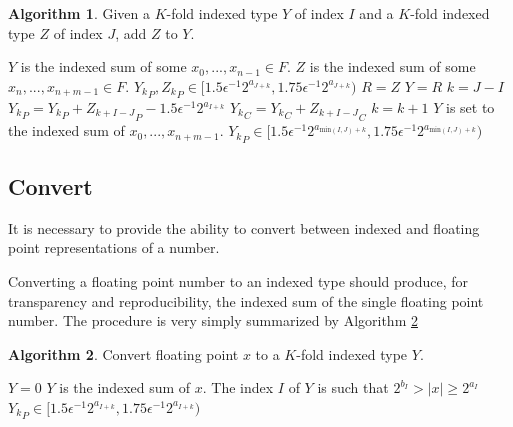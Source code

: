 \documentclass[12pt]{article}
\providecommand{\min}{\ensuremath{\text{min}}}
\theoremstyle{definition}
\newtheorem{alg}{Algorithm}[section]
\numberwithin{equation}{section}
\numberwithin{figure}{section}
\begin{document}
    \begin{samepage}
    \begin{alg}
      Given a $K$-fold indexed type $Y$ of index $I$ and a $K$-fold indexed type $Z$ of index $J$, add $Z$ to $Y$.
      \begin{algorithmic}[1]
        \Ensure
          \Statex $Y$ is the indexed sum of some $x_0, ..., x_{n - 1} \in F$.
          \Statex $Z$ is the indexed sum of some $x_n, ..., x_{n + m - 1} \in F$.
          \Statex ${Y_k}_P, {Z_k}_P \in [1.5  \epsilon^{-1} 2^{a_{J + k}}, 1.75  \epsilon^{-1} 2^{a_{J + k}})$
          \State {}
          \State {}
            \State $R = Z$
            \State {}
            \State $Y = R$
          \EndIf
          \State $k = J - I$
            \State ${Y_{k}}_P = {Y_{k}}_P + {Z_{k + I - J}}_P - 1.5  \epsilon^{-1}  2^{a_{I + k}}$
            \State ${Y_{k}}_C = {Y_{k}}_C + {Z_{k + I - J}}_C$
            \State $k = k + 1$
          \EndWhile
          \State {}
        \EndFunction
        \Ensure
          \Statex $Y$ is set to the indexed sum of $x_0, ..., x_{n + m - 1}$.
          \Statex ${Y_k}_P \in [1.5  \epsilon^{-1} 2^{a_{\min(I, J) + k}}, 1.75  \epsilon^{-1} 2^{a_{\min(I, J) + k}})$
      \end{algorithmic}
      \label{alg:reduce}
    \end{alg}
    \end{samepage}

  \subsection{Convert}
    \label{sec:primitiveops_convert}
    It is necessary to provide the ability to convert between indexed and floating point representations of a number.

    Converting a floating point number to an indexed type should produce, for transparency and reproducibility, the indexed sum of the single floating point number.
    The procedure is very simply summarized by Algorithm \ref{alg:conv2indexed}

    \begin{samepage}
    \begin{alg}
      Convert floating point $x$ to a $K$-fold indexed type $Y$.
      \begin{algorithmic}[1]
          \State $Y = 0$
          \State {}
          \State {} \label{alg:conv2indexed:deposit}
          \State {}
        \EndFunction
        \Ensure
          $Y$ is the indexed sum of $x$.
          The index $I$ of $Y$ is such that $2^{b_I} > |x| \geq 2^{a_I}$
          ${Y_k}_P \in [1.5  \epsilon^{-1} 2^{a_{I + k}}, 1.75  \epsilon^{-1} 2^{a_{I + k}})$
      \end{algorithmic}
      \label{alg:conv2indexed}
    \end{alg}
    \end{samepage}
\end{document}
